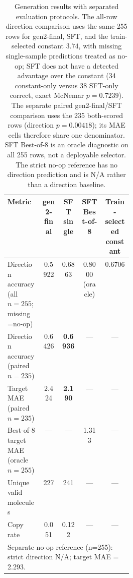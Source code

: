 \begin{table}[t]
\centering
\caption{Generation results with separated evaluation protocols. The all-row direction comparison uses the same 255 rows for gen2-final, SFT, and the train-selected constant $3.74$, with missing single-sample predictions treated as no-op; SFT does not have a detected advantage over the constant (34 constant-only versus 38 SFT-only correct, exact McNemar $p=0.7239$). The separate paired gen2-final/SFT comparison uses the 235 both-scored rows (direction $p=0.00418$); its MAE cells therefore share one denominator. SFT Best-of-8 is an oracle diagnostic on all 255 rows, not a deployable selector. The strict no-op reference has no direction prediction and is N/A rather than a direction baseline.}
\label{tab:generation}
\small
\begin{tabular}{@{}p{0.29\linewidth}cccc@{}}
\toprule
Metric & gen2-final & SFT single & SFT Best-of-8 & Train-selected constant \\
\midrule
Direction accuracy (all $n=255$; missing=no-op) & 0.5922 & 0.6863 & 0.8000 (oracle) & 0.6706 \\
Direction accuracy (paired $n=235$) & 0.6426 & \textbf{0.6936} & --- & --- \\
Target MAE (paired $n=235$) & 2.424 & \textbf{2.190} & --- & --- \\
Best-of-8 target MAE (oracle $n=255$) & --- & --- & 1.313 & --- \\
Unique valid molecules & 227 & 241 & --- & --- \\
Copy rate & 0.051 & 0.122 & --- & --- \\
\midrule
\multicolumn{5}{l}{Separate no-op reference (n=255): strict direction N/A; target MAE = 2.293.} \\
\bottomrule
\end{tabular}
\end{table}
